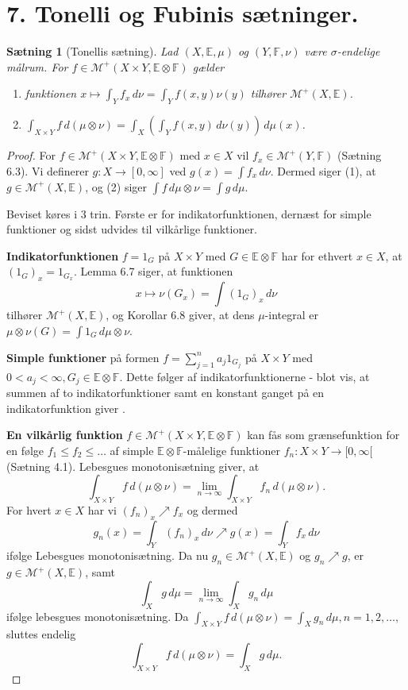 \documentclass[12pt]{report}
\newtheorem{theorem}[lemma]{Sætning}
\theoremstyle{break}
\newtheorem*{proof}{Bevis}
\theoremstyle{break}
\newcommand{\Int}[1]{\int#1\,d\mu}
\newcommand{\EE}{\mathbb{E}}
\newcommand{\FF}{\mathbb{F}}
\newcommand{\M}{\mathcal{M}^+}
\begin{document}
\newpage
\section*{7. Tonelli og Fubinis sætninger.}
\begin{theorem}[Tonellis sætning]
Lad $(X,\EE,\mu)$ og $(Y,\FF,\nu)$ være $\sigma$-endelige målrum. For $f\in\M(X\times Y,\EE\otimes\FF)$ gælder
\begin{enumerate}
\item funktionen $x\mapsto\int_Yf_x\,d\nu = \int_Yf(x,y)\nu(y)$ tilhører $\M(X,\EE)$.
\item $\int_{X\times Y}f\,d(\mu\otimes\nu)=\int_X(\int_Yf(x,y)\,d\nu(y))\,d\mu(x)$.
\end{enumerate}
\end{theorem}
\begin{proof}
For $f\in\M(X\times Y,\EE\otimes\FF)$ med $x\in X$ vil $f_x\in\M(Y,\FF)$ (Sætning 6.3). Vi definerer $g\colon X\to[0,\infty]$ ved $g(x)=\int f_x\,d\nu$. Dermed siger (1), at $g\in\M(X,\EE)$, og (2) siger $\int f\,d\mu\otimes\nu=\Int{g}$.

\bigskip

Beviset køres i 3 trin. Første er for indikatorfunktionen, dernæst for simple funktioner og sidst udvides til vilkårlige funktioner.

\bigskip

{\textbf{Indikatorfunktionen}} $f=1_G$ på $X\times Y$ med $G\in\EE\otimes\FF$ har for ethvert $x\in X$, at $(1_G)_x=1_{G_x}$. Lemma 6.7 siger, at funktionen
\[x\mapsto\nu(G_x)=\int(1_G)_x\,d\nu\]
tilhører $\M(X,\EE)$, og Korollar 6.8 giver, at dens $\mu$-integral er $\mu\otimes\nu(G)=\int 1_G\,d\mu\otimes\nu.$

\bigskip

{\textbf{Simple funktioner}} på formen $f=\sum_{j=1}^na_j1_{G_j}$ på $X\times Y$ med $0<a_j<\infty, G_j\in\EE\otimes\FF$. Dette følger af indikatorfunktionerne - blot vis, at summen af to indikatorfunktioner samt en konstant ganget på en indikatorfunktion giver .

\bigskip

{\textbf{En vilkårlig funktion}} $f\in\M(X\times Y,\EE\otimes\FF)$ kan fås som grænsefunktion for en følge $f_1\leq f_2\leq\ldots$ af simple $\EE\otimes\FF$-målelige funktioner $f_n\colon X\times Y\to[0,\infty[$ (Sætning 4.1). Lebesgues monotonisætning giver, at 
\[\int_{X\times Y}f\,d(\mu\otimes\nu)=\lim\limits_{n\to\infty}\int_{X\times Y}f_n\,d(\mu\otimes\nu).\]
For hvert $x\in X$ har vi $(f_n)_x\nearrow f_x$ og dermed
\[g_n(x)=\int_Y(f_n)_x\,d\nu\nearrow g(x)=\int_Y f_x\,d\nu\]
ifølge Lebesgues monotonisætning. Da nu $g_n\in\M(X,\EE)$ og $g_n\nearrow g$, er $g\in\M(X,\EE)$, samt
\[\int_X g\,d\mu = \lim\limits_{n\to\infty}\int_Xg_n\,d\mu\]
ifølge lebesgues monotonisætning. Da $\int_{X\times Y}f\,d(\mu\otimes\nu)=\int_Xg_n\,d\mu, n=1,2,\ldots,$ sluttes endelig
\[\int_{X\times Y}f\,d(\mu\otimes\nu)=\int_X g\,d\mu.\]
\end{proof}
\end{document}
